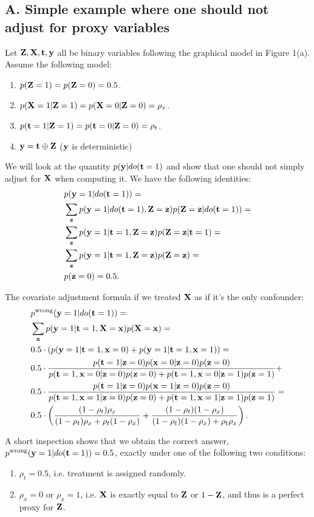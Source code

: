 \subsection*{A. Simple example where one should not adjust for proxy variables}\label{appsec:simp}

Let $\mathbf{Z},\mathbf{X},\mathbf{t},\mathbf{y}$ all be binary variables following the graphical model in Figure 1(a).
Assume the following model:
\begin{enumerate}
\item $p(\mathbf{Z}=1) = p(\mathbf{Z}=0) = 0.5$.
\item $p(\mathbf{X}=1|\mathbf{Z}=1) = p(\mathbf{X}=0|\mathbf{Z}=0) = \rho_x$.
\item $p(\mathbf{t}=1|\mathbf{Z}=1) = p(\mathbf{t}=0|\mathbf{Z}=0) = \rho_t$.
\item $\mathbf{y} = \mathbf{t} \oplus \mathbf{Z}$ ($\mathbf{y}$ is deterministic)
\end{enumerate}
We will look at the quantity $p(\mathbf{y}|do(\mathbf{t}=1)$ and show that one should not simply adjust for $\mathbf{X}$ when computing it. 
We have the following identities:
\begin{align*}
&p(\mathbf{y}=1|do(\mathbf{t}=1)) = \\
&\sum_{\mathbf{z}} p(\mathbf{y}=1|do(\mathbf{t}=1),\mathbf{Z}=\mathbf{z})p(\mathbf{Z}=\mathbf{z}|do(\mathbf{t}=1)) = \\
&\sum_{\mathbf{z}} p(\mathbf{y}=1|\mathbf{t}=1,\mathbf{Z}=\mathbf{z})p(\mathbf{Z}=\mathbf{z}|\mathbf{t}=1) = \\
&\sum_{\mathbf{z}} p(\mathbf{y}=1|\mathbf{t}=1,\mathbf{Z}=\mathbf{z})p(\mathbf{Z}=\mathbf{z}) = \\
&p(\mathbf{z}=0) = 0.5.
\end{align*}

The covariate adjustment formula if we treated $\mathbf{X}$ as if it's the only confounder:
\begin{align*}
&p^{\text{wrong}}(\mathbf{y}=1|do(\mathbf{t}=1)) = \\
&\sum_{\mathbf{x}} p(\mathbf{y}=1|\mathbf{t}=1,\mathbf{X}=\mathbf{x})p(\mathbf{X}=\mathbf{x}) = \\
&0.5 \cdot \left(p(\mathbf{y}=1|\mathbf{t}=1,\mathbf{x}=0) + p(\mathbf{y}=1|\mathbf{t}=1,\mathbf{x}=1)\right) = \\
&0.5\cdot\frac{p(\mathbf{t}=1|\mathbf{z}=0) p(\mathbf{x}=0|\mathbf{z}=0) p(\mathbf{z}=0)}{p(\mathbf{t}=1,\mathbf{x}=0|\mathbf{z}=0)p(\mathbf{z}=0) + p(\mathbf{t}=1,\mathbf{x}=0|\mathbf{z}=1)p(\mathbf{z}=1)} + \\
& 0.5 \cdot \frac{p(\mathbf{t}=1|\mathbf{z}=0) p(\mathbf{x}=1|\mathbf{z}=0) p(\mathbf{z}=0)}{p(\mathbf{t}=1,\mathbf{x}=1|\mathbf{z}=0)p(\mathbf{z}=0) + p(\mathbf{t}=1,\mathbf{x}=1|\mathbf{z}=1)p(\mathbf{z}=1)} = \\
& 0.5 \cdot  \left(\frac{(1-\rho_t)\rho_x}{(1-\rho_t) \rho_x + \rho_t (1-\rho_x)} + \frac{(1-\rho_t)(1-\rho_x)}{(1-\rho_t)(1-\rho_x) + \rho_t \rho_x}\right).
\end{align*}

A short inspection shows that we obtain the correct answer, $p^{\text{wrong}}(\mathbf{y}=1|do(\mathbf{t}=1)) = 0.5$, exactly under one of the following two conditions:
\begin{enumerate}
\item $\rho_t = 0.5$, i.e. treatment is assigned randomly.
\item $\rho_x = 0$ or $\rho_x = 1$, i.e. $\mathbf{X}$ is exactly equal to $\mathbf{Z}$ or $1-\mathbf{Z}$, and thus is a perfect proxy for $\mathbf{Z}$.
\end{enumerate}


